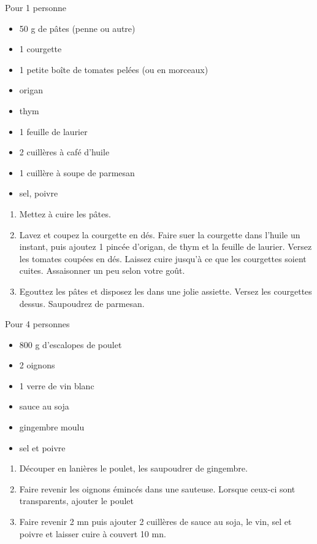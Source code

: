 {Pour 1 personne}{\begin{itemize}
	\item 50 g de pâtes (penne ou autre)
	\item 1 courgette
	\item 1 petite boîte de tomates pelées (ou en morceaux)
	\item origan
	\item thym
	\item 1 feuille de laurier
	\item 2 cuillères à café d'huile
	\item 1 cuillère à soupe de parmesan
	\item sel, poivre
\end{itemize}}
{\phantom{.}

\bigskip
\begin{enumerate}
	\item Mettez à cuire les pâtes.
	\item Lavez et coupez la courgette en dés. Faire suer la courgette dans l'huile un instant, puis ajoutez 1 pincée d'origan, de thym et la feuille de laurier. Versez les tomates coupées en dés. Laissez cuire jusqu'à ce que les courgettes soient cuites. Assaisonner un peu selon votre goût.
	\item Egouttez les pâtes et disposez les dans une jolie assiette. Versez les courgettes dessus. Saupoudrez de parmesan.
\end{enumerate}

\bigskip
\phantom{.}}

\bigskip
{}
{Pour 4 personnes}{\begin{itemize}
	\item 800 g d'escalopes de poulet
	\item 2 oignons
	\item 1 verre de vin blanc
	\item sauce au soja
	\item gingembre moulu
	\item sel et poivre
\end{itemize}}
{\phantom{.}

\bigskip
\begin{enumerate}
	\item Découper en lanières le poulet, les saupoudrer de gingembre.
	\item Faire revenir les oignons émincés dans une sauteuse. Lorsque ceux-ci sont transparents, ajouter le poulet 
	\item Faire revenir 2 mn puis ajouter 2 cuillères de sauce au soja, le vin, sel et poivre et laisser cuire à couvert 10 mn.
\end{enumerate}

\bigskip
\phantom{.}}

